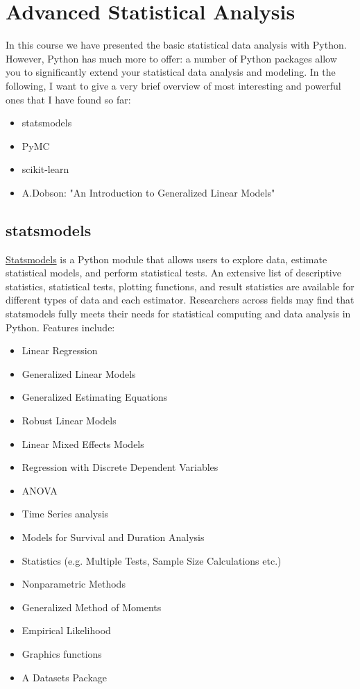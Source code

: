 \chapter{Advanced Statistical Analysis}

In this course we have presented the basic statistical data analysis with Python. However, Python has much more to offer: a number of Python packages allow you to significantly extend your statistical data analysis and modeling. In the following, I want to give a very brief overview of most interesting and powerful ones that I have found so far:

\begin{itemize}
  \item statsmodels
  \item PyMC
  \item scikit-learn
  \item A.Dobson: "An Introduction to Generalized Linear Models"
\end{itemize}

\section{statsmodels}

\href{http://statsmodels.sourceforge.net/}{Statsmodels} is a Python module that allows users to explore data, estimate statistical models, and perform statistical tests. An extensive list of descriptive statistics, statistical tests, plotting functions, and result statistics are available for different types of data and each estimator. Researchers across fields may find that statsmodels fully meets their needs for statistical computing and data analysis in Python. Features include:

\begin{itemize}
  \item   Linear Regression
  \item   Generalized Linear Models
  \item   Generalized Estimating Equations
  \item   Robust Linear Models
  \item   Linear Mixed Effects Models
  \item   Regression with Discrete Dependent Variables
  \item   ANOVA
  \item   Time Series analysis
  \item   Models for Survival and Duration Analysis
  \item   Statistics (e.g. Multiple Tests, Sample Size Calculations etc.)
  \item   Nonparametric Methods
  \item   Generalized Method of Moments
  \item   Empirical Likelihood
  \item  Graphics functions
  \item  A Datasets Package
\end{itemize}

